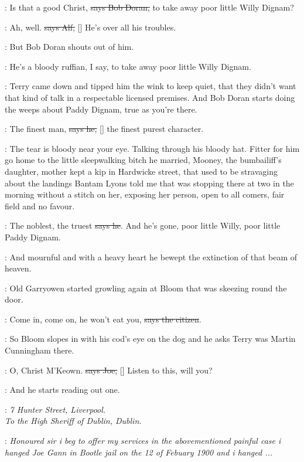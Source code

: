 \doran:
Is that a good Christ, \sout{says Bob Doran,}
to take away poor little Willy
Dignam?

\bergan:
Ah, well. \sout{says Alf,}
[]
He's over all his troubles.

\Nq:
But Bob Doran shouts out of him.

\doran:
He's a bloody ruffian, I say,
to take away poor little Willy Dignam.

\Nq:
Terry came down and tipped him the wink to keep quiet, that they
didn't want that kind of talk in a respectable licensed premises. And Bob
Doran starts doing the weeps about Paddy Dignam, true as you're there.

\doran:
The finest man, \sout{says he,}
[] the finest purest character.

\Nq:
The tear is bloody near your eye. Talking through his bloody hat.
Fitter for him go home to the little sleepwalking bitch he married,
Mooney, the bumbailiff's daughter, mother kept a kip in Hardwicke street,
that used to be stravaging about the landings
Bantam Lyons told me that
was stopping there at two in the morning without a stitch on her, exposing
her person, open to all comers, fair field and no favour.

\doran:
The noblest, the truest \sout{says he}.
And he's gone, poor little Willy, poor
little Paddy Dignam.

:
And mournful and with a heavy heart he bewept the extinction of that
beam of heaven.

\Nq:
Old Garryowen started growling again at Bloom that was skeezing
round the door.

\citizen:
Come in, come on, he won't eat you,
\sout{says the citizen}.

\Nq:
So Bloom slopes in with his cod's eye on the dog
and he asks Terry
was Martin Cunningham there.

\joe:
O, Christ M'Keown. \sout{says Joe,}
[]
Listen to this, will you?

\Nq:
And he starts reading out one.


\joe:
\emph{7 Hunter Street, Liverpool.\\
To the High Sheriff of Dublin, Dublin.}

\joe:
\emph{Honoured sir i beg to offer my services in the abovementioned painful
case i hanged Joe Gann in Bootle jail on the 12 of Febuary 1900
and i
hanged ...}

